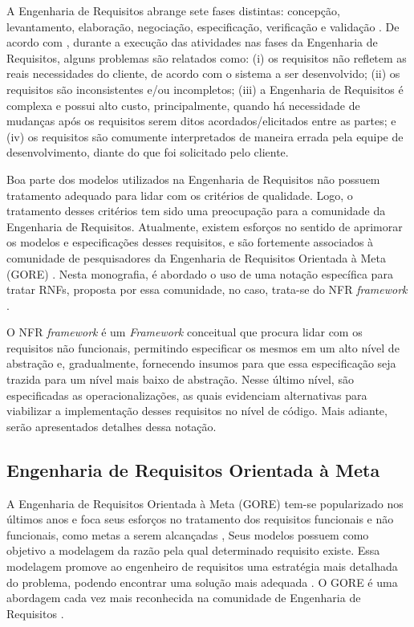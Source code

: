 A Engenharia de Requisitos abrange sete fases distintas: concepção, levantamento, elaboração, negociação, especificação, verificação e validação \cite{pressman2011engenharia}. De acordo com \cite{kotonya1998requirements}, durante a execução das atividades nas fases da Engenharia de Requisitos, alguns problemas são relatados como: (i) os requisitos não refletem as reais necessidades do cliente, de acordo com o sistema a ser desenvolvido; (ii) os requisitos são inconsistentes e/ou incompletos; (iii) a Engenharia de Requisitos é complexa e possui alto custo, principalmente, quando há necessidade de mudanças após os requisitos serem ditos acordados/elicitados entre as partes; e (iv) os requisitos são comumente interpretados de maneira errada pela equipe de desenvolvimento, diante do que foi solicitado pelo cliente. 

Boa parte dos modelos utilizados na Engenharia de Requisitos não possuem tratamento adequado para lidar com os critérios de qualidade. Logo, o tratamento desses critérios tem sido uma preocupação para a comunidade da Engenharia de Requisitos. Atualmente, existem esforços no sentido de aprimorar os modelos e especificações desses requisitos, e são fortemente associados à comunidade de pesquisadores da Engenharia de Requisitos Orientada à Meta (GORE) \cite{chung2012non}. Nesta monografia, é abordado o uso de uma notação específica para tratar RNFs, proposta por essa comunidade, no caso, trata-se do NFR \textit{framework} \cite{chung2012non}. 

O NFR \textit{framework} é um \textit{Framework} conceitual que procura lidar com os requisitos não funcionais, permitindo especificar os mesmos em um alto nível de abstração e, gradualmente, fornecendo insumos para que essa especificação seja trazida para um nível mais baixo de abstração. Nesse último nível, são especificadas as operacionalizações, as quais evidenciam alternativas para viabilizar a implementação desses requisitos no nível de código. Mais adiante, serão apresentados detalhes dessa notação.

\subsection{Engenharia de Requisitos Orientada à Meta}
\label{subsec:orientacaoMeta}

A Engenharia de Requisitos Orientada à Meta (GORE) tem-se popularizado nos últimos anos e foca seus esforços no tratamento dos requisitos funcionais e não funcionais, como metas a serem alcançadas \cite{van2001goal}, Seus modelos possuem como objetivo a modelagem da razão pela qual determinado requisito existe. Essa modelagem promove ao engenheiro de requisitos uma estratégia mais detalhada do problema, podendo encontrar uma solução mais adequada \cite{van2001goal}\cite{chung2012non}. O GORE é uma abordagem cada vez mais reconhecida na comunidade de Engenharia de Requisitos \cite{van2001goal}.

